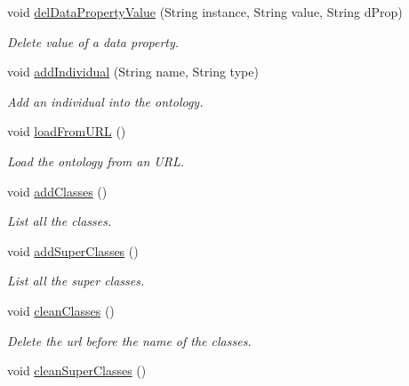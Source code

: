 \begin{DoxyCompactItemize}
void \hyperlink{class_ontology_1_1_ontology_a27eb6537f5520169dbcf6a8fd2360b5d}{delDataPropertyValue} (String instance, String value, String dProp)
\begin{DoxyCompactList}\small\item\em Delete value of a data property. \end{DoxyCompactList}\item 
void \hyperlink{class_ontology_1_1_ontology_a814db63a721741ed45084cbba0a322ba}{addIndividual} (String name, String type)
\begin{DoxyCompactList}\small\item\em Add an individual into the ontology. \end{DoxyCompactList}\item 
\hypertarget{class_ontology_1_1_ontology_a6f61430c49fe037a18b5267c02d1923a}{
void \hyperlink{class_ontology_1_1_ontology_a6f61430c49fe037a18b5267c02d1923a}{loadFromURL} ()}
\label{class_ontology_1_1_ontology_a6f61430c49fe037a18b5267c02d1923a}

\begin{DoxyCompactList}\small\item\em Load the ontology from an URL. \end{DoxyCompactList}\item 
void \hyperlink{class_ontology_1_1_ontology_a0b354cebd902e4cde66d5407e8e353ca}{addClasses} ()
\begin{DoxyCompactList}\small\item\em List all the classes. \end{DoxyCompactList}\item 
void \hyperlink{class_ontology_1_1_ontology_a7028d98e45511b5dbab527e311dd24a6}{addSuperClasses} ()
\begin{DoxyCompactList}\small\item\em List all the super classes. \end{DoxyCompactList}\item 
\hypertarget{class_ontology_1_1_ontology_a8290f5c9dd5e48694ab41c029edb8e47}{
void \hyperlink{class_ontology_1_1_ontology_a8290f5c9dd5e48694ab41c029edb8e47}{cleanClasses} ()}
\label{class_ontology_1_1_ontology_a8290f5c9dd5e48694ab41c029edb8e47}

\begin{DoxyCompactList}\small\item\em Delete the url before the name of the classes. \end{DoxyCompactList}\item 
\hypertarget{class_ontology_1_1_ontology_adfbd3af5b4506c74edbed5416e588ee6}{
void \hyperlink{class_ontology_1_1_ontology_adfbd3af5b4506c74edbed5416e588ee6}{cleanSuperClasses} ()}
\label{class_ontology_1_1_ontology_adfbd3af5b4506c74edbed5416e588ee6}


\end{DoxyCompactItemize}
